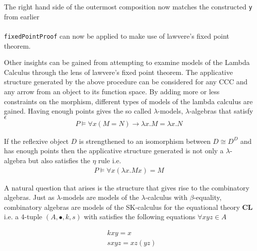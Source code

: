 \begin{AgdaMultiCode}
\\
\\
The right hand side of the outermost composition now matches the constructed
\verb|y| from earlier \\
 \\
\verb|fixedPointProof| can now be applied to make use of lawvere's fixed point
theorem. \\
\end{AgdaMultiCode}

Other insights can be gained from attempting to examine models of the Lambda
Calculus through the lens of lawvere's fixed point theorem. The applicative
structure generated by the above procedure can be considered for any CCC and any
arrow from an object to its function space. By adding more or less constraints
on the morphism, different types of models of the lambda calculus are gained.
Having enough points gives the so called $\lambda$-models, $\lambda$-algebras
that satisfy $\epsilon$
\begin{align*}
    P \vDash \forall x (M = N) \rightarrow \lambda x . M = \lambda x
    . N
\end{align*}

If the reflexive object $D$ is strengthened to an isomorphism between $D \cong
D^D$ and has enough points then the applicative structure generated is not only
a $\lambda$-algebra but also satisfies the $\eta$ rule i.e.
\begin{align*}
    P \vDash \forall x (\lambda x . M x) = M
\end{align*}

A natural question that arises is the structure that gives rise to the
combinatory algebras. Just as $\lambda$-models are models of the
$\lambda$-calculus with $\beta$-equality, combinatory algebras are models of the
SK-calculus for the equational theory \textbf{CL} i.e. a 4-tuple $(A, \bullet,
k, s)$ with satisfies the following equations $\forall x y z \in A$

\begin{align*}
    &k x y = x \\
    &s x y z = x z (y z)
\end{align*}

